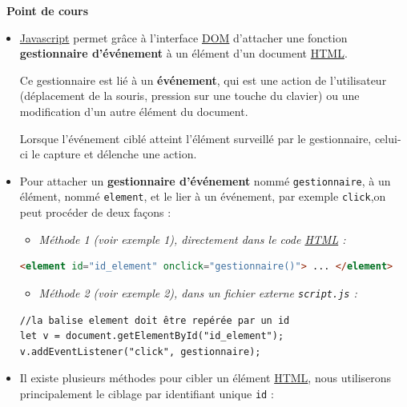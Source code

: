 \documentclass[
  11pt,
]{article}
\newcommand{\passthrough}[1]{#1}
\providecommand{\tightlist}{%
  \setlength{\itemsep}{0pt}\setlength{\parskip}{0pt}}
\newcounter{cours}
\newenvironment{cours}[1]
{\par \medskip   \addtocounter{cours}{1} \noindent  
\begin{bclogo}[arrondi =0.1,  ombre = true, barre=none, logo=\bcbook, marge=4]{~\textbf{Point de cours} \textbf{\thecours} {\itshape #1} }  \par}
{
\end{bclogo}
 \par \bigskip }
\begin{document}
\begin{cours}{}

\begin{itemize}
\item
  \href{https://developer.mozilla.org/fr/docs/Glossaire/JavaScript}{Javascript}
  permet grâce à l'interface
  \href{https://developer.mozilla.org/fr/docs/Glossaire/DOM}{DOM}
  d'attacher une fonction \textbf{gestionnaire d'événement} à un élément
  d'un document
  \href{https://developer.mozilla.org/fr/docs/Glossaire/HTML}{HTML}.

  Ce gestionnaire est lié à un \textbf{événement}, qui est une action de
  l'utilisateur (déplacement de la souris, pression sur une touche du
  clavier) ou une modification d'un autre élément du document.

  Lorsque l'événement ciblé atteint l'élément surveillé par le
  gestionnaire, celui-ci le capture et délenche une action.
\item
  Pour attacher un \textbf{gestionnaire d'événement} nommé
  \passthrough{\lstinline!gestionnaire!}, à un élément, nommé
  \passthrough{\lstinline!element!}, et le lier à un événement, par
  exemple \passthrough{\lstinline!click!},on peut procéder de deux
  façons :

  \begin{itemize}
  \tightlist
  \item
    \emph{Méthode 1 (voir exemple 1), directement dans le code
    \href{https://developer.mozilla.org/fr/docs/Glossaire/HTML}{HTML} :}
  \end{itemize}

\begin{lstlisting}[language=HTML]
<element id="id_element" onclick="gestionnaire()"> ... </element>
\end{lstlisting}

  \begin{itemize}
  \tightlist
  \item
    \emph{Méthode 2 (voir exemple 2), dans un fichier externe
    \passthrough{\lstinline!script.js!} :}
  \end{itemize}

\begin{lstlisting}
//la balise element doit être repérée par un id 
let v = document.getElementById("id_element");
v.addEventListener("click", gestionnaire);
\end{lstlisting}
\item
  Il existe plusieurs méthodes pour cibler un élément
  \href{https://developer.mozilla.org/fr/docs/Glossaire/HTML}{HTML},
  nous utiliserons principalement le ciblage par identifiant unique
  \passthrough{\lstinline!id!} :
\end{itemize}


\end{cours}
\end{document}
